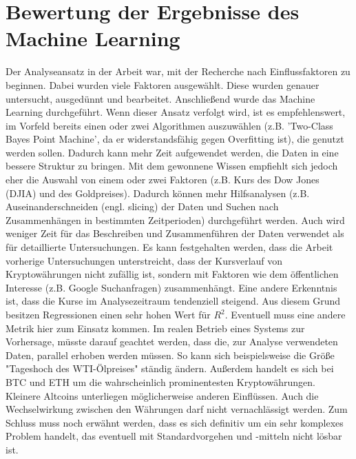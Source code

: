 \section{Bewertung der Ergebnisse des Machine Learning}\label{sec:BewertungML}
Der Analyseansatz in der Arbeit war, mit der Recherche nach Einflussfaktoren zu beginnen. Dabei wurden viele Faktoren ausgewählt. Diese wurden genauer untersucht, ausgedünnt und bearbeitet. Anschließend wurde das Machine Learning durchgeführt. Wenn dieser Ansatz verfolgt wird, ist es empfehlenswert, im Vorfeld bereits einen oder zwei Algorithmen auszuwählen (z.B. 'Two-Class Bayes Point Machine', da er widerstandsfähig gegen Overfitting ist), die genutzt werden sollen. Dadurch kann mehr Zeit aufgewendet werden, die Daten in eine bessere Struktur zu bringen.\newline
Mit dem gewonnene Wissen empfiehlt sich jedoch eher die Auswahl von einem oder zwei Faktoren (z.B. Kurs des Dow Jones (DJIA) und des Goldpreises). Dadurch können mehr Hilfsanalysen (z.B. Auseinanderschneiden (engl. slicing) der Daten und Suchen nach Zusammenhängen in bestimmten Zeitperioden) durchgeführt werden. Auch wird weniger Zeit für das Beschreiben und Zusammenführen der Daten verwendet als für detaillierte Untersuchungen.\newline
Es kann festgehalten werden, dass die Arbeit vorherige Untersuchungen unterstreicht, dass der Kursverlauf von Kryptowährungen nicht zufällig ist, sondern mit Faktoren wie dem öffentlichen Interesse (z.B. Google Suchanfragen) zusammenhängt.\newline
Eine andere Erkenntnis ist, dass die Kurse im Analysezeitraum tendenziell steigend. Aus diesem Grund besitzen Regressionen einen sehr hohen Wert für $ R^2 $. Eventuell muss eine andere Metrik hier zum Einsatz kommen.\newline
Im realen Betrieb eines Systems zur Vorhersage, müsste darauf geachtet werden, dass die, zur Analyse verwendeten Daten, parallel erhoben werden müssen. So kann sich beispielsweise die Größe "Tageshoch des WTI-Ölpreises" ständig ändern. Außerdem handelt es sich bei BTC und ETH um die wahrscheinlich prominentesten Kryptowährungen. Kleinere Altcoins unterliegen möglicherweise anderen Einflüssen. Auch die Wechselwirkung zwischen den Währungen darf nicht vernachlässigt werden.\newline
Zum Schluss muss noch erwähnt werden, dass es sich definitiv um ein sehr komplexes Problem handelt, das eventuell mit Standardvorgehen und -mitteln nicht lösbar ist.